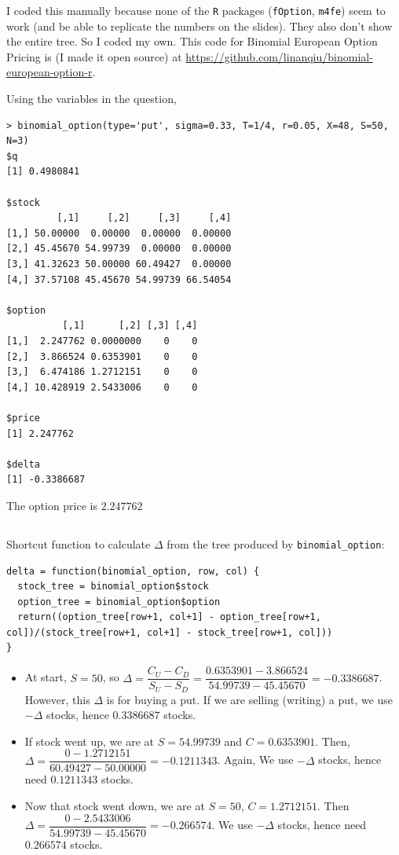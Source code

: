 \documentclass[11pt]{scrartcl}
\begin{document}
I coded this manually because none of the \texttt{R} packages (\texttt{fOption}, \texttt{m4fe}) seem to work (and be able to replicate the numbers on the slides). They also don't show the entire tree. So I coded my own. This code for Binomial European Option Pricing is (I made it open source) at \url{https://github.com/linanqiu/binomial-european-option-r}.

Using the variables in the question,

\begin{lstlisting}
> binomial_option(type='put', sigma=0.33, T=1/4, r=0.05, X=48, S=50, N=3)
$q
[1] 0.4980841

$stock
         [,1]     [,2]     [,3]     [,4]
[1,] 50.00000  0.00000  0.00000  0.00000
[2,] 45.45670 54.99739  0.00000  0.00000
[3,] 41.32623 50.00000 60.49427  0.00000
[4,] 37.57108 45.45670 54.99739 66.54054

$option
          [,1]      [,2] [,3] [,4]
[1,]  2.247762 0.0000000    0    0
[2,]  3.866524 0.6353901    0    0
[3,]  6.474186 1.2712151    0    0
[4,] 10.428919 2.5433006    0    0

$price
[1] 2.247762

$delta
[1] -0.3386687
\end{lstlisting}

The option price is $2.247762$

\subsection{}

Shortcut function to calculate $\Delta$ from the tree produced by \texttt{binomial\_option}:

\begin{lstlisting}
delta = function(binomial_option, row, col) {
  stock_tree = binomial_option$stock
  option_tree = binomial_option$option
  return((option_tree[row+1, col+1] - option_tree[row+1, col])/(stock_tree[row+1, col+1] - stock_tree[row+1, col]))
}
\end{lstlisting}

\begin{itemize}
\item At start, $S=50$, so $\Delta = \dfrac{C_U-C_D}{S_U-S_D} = \dfrac{0.6353901 - 3.866524}{54.99739-45.45670} = -0.3386687$. However, this $\Delta$ is for buying a put. If we are selling (writing) a put, we use $-\Delta$ stocks, hence $0.3386687$ stocks.
\item If stock went up, we are at $S=54.99739$ and $C = 0.6353901$. Then, $\Delta = \dfrac{0 - 1.2712151}{60.49427 - 50.00000} = -0.1211343$. Again, We use $-\Delta$ stocks, hence need $0.1211343$ stocks.
\item Now that stock went down, we are at $S=50$, $C=1.2712151$. Then $\Delta = \dfrac{0 - 2.5433006}{54.99739 - 45.45670} = -0.266574$. We use $-\Delta$ stocks, hence need $0.266574$ stocks.
\end{itemize}
\end{document}
